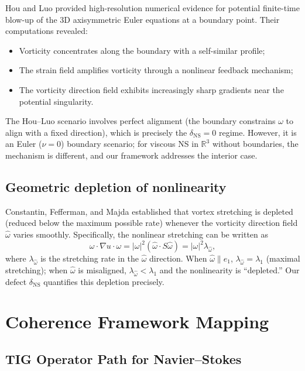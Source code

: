 \documentclass[11pt]{article}
\theoremstyle{definition}
\theoremstyle{remark}
\newcommand{\R}{\mathbb{R}}
\begin{document}
Hou and Luo \cite{HL} provided high-resolution numerical evidence for potential
finite-time blow-up of the 3D axisymmetric Euler equations at a boundary point.
Their computations revealed:
\begin{itemize}[nosep]
  \item Vorticity concentrates along the boundary with a self-similar profile;
  \item The strain field amplifies vorticity through a nonlinear feedback mechanism;
  \item The vorticity direction field exhibits increasingly sharp gradients near the
    potential singularity.
\end{itemize}
The Hou--Luo scenario involves perfect alignment (the boundary constrains $\omega$
to align with a fixed direction), which is precisely the $\delta_{\mathrm{NS}} = 0$
regime.  However, it is an Euler ($\nu = 0$) boundary scenario; for viscous NS in
$\R^3$ without boundaries, the mechanism is different, and our framework addresses
the interior case.

\subsection{Geometric depletion of nonlinearity}

Constantin, Fefferman, and Majda \cite{CF2} established that vortex stretching is
depleted (reduced below the maximum possible rate) whenever the vorticity direction
field $\hat\omega$ varies smoothly.  Specifically, the nonlinear stretching can be
written as
\[
  \omega \cdot \nabla u \cdot \omega = |\omega|^2 (\hat\omega \cdot S\hat\omega)
  = |\omega|^2 \lambda_{\hat\omega},
\]
where $\lambda_{\hat\omega}$ is the stretching rate in the $\hat\omega$ direction.
When $\hat\omega \| e_1$, $\lambda_{\hat\omega} = \lambda_1$ (maximal stretching);
when $\hat\omega$ is misaligned, $\lambda_{\hat\omega} < \lambda_1$ and the
nonlinearity is ``depleted.''  Our defect $\delta_{\mathrm{NS}}$ quantifies this
depletion precisely.

\section{Coherence Framework Mapping}
\label{sec:coherence}

\subsection{TIG Operator Path for Navier--Stokes}
\end{document}
